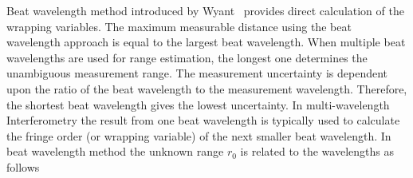 Beat wavelength method introduced by Wyant~\cite{Wyant:71} provides direct calculation of the wrapping variables. The maximum measurable distance using the beat wavelength approach is equal to the largest beat wavelength. 
When multiple beat wavelengths are used for range estimation, the longest one determines the unambiguous measurement range. The measurement uncertainty is dependent upon the ratio of the beat wavelength to the measurement wavelength. Therefore, the shortest beat wavelength gives the lowest uncertainty. In multi-wavelength Interferometry the result from one beat wavelength is typically used to calculate the fringe order (or wrapping variable) of the next smaller beat wavelength. In beat wavelength method the unknown range $r_0$ is related to the wavelengths as follows~\cite{Falaggis-generalized-th-of-PU-2012}
